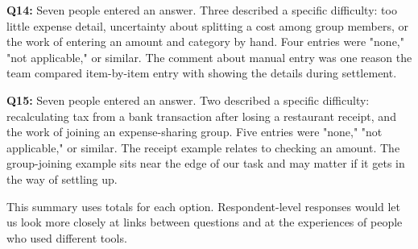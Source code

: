 \textbf{Q14:} Seven people entered an answer. Three described a specific difficulty: too little expense detail, uncertainty about splitting a cost among group members, or the work of entering an amount and category by hand. Four entries were "none," "not applicable," or similar. The comment about manual entry was one reason the team compared item-by-item entry with showing the details during settlement.

\textbf{Q15:} Seven people entered an answer. Two described a specific difficulty: recalculating tax from a bank transaction after losing a restaurant receipt, and the work of joining an expense-sharing group. Five entries were "none," "not applicable," or similar. The receipt example relates to checking an amount. The group-joining example sits near the edge of our task and may matter if it gets in the way of settling up.

This summary uses totals for each option. Respondent-level responses would let us look more closely at links between questions and at the experiences of people who used different tools.


